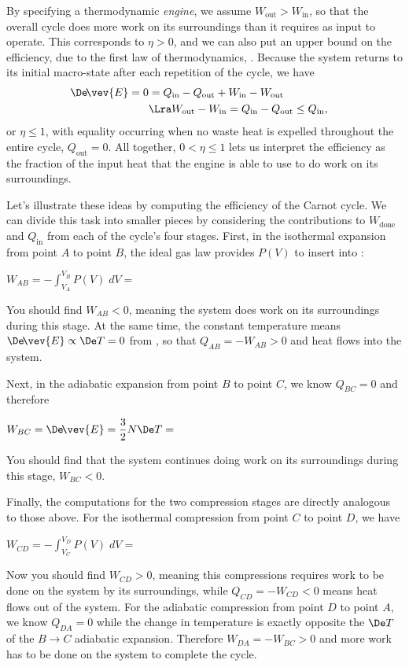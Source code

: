 By specifying a thermodynamic \textit{engine}, we assume $W_{\text{out}} > W_{\text{in}}$, so that the overall cycle does more work on its surroundings than it requires as input to operate.
This corresponds to $\eta > 0$, and we can also put an upper bound on the efficiency, due to the first law of thermodynamics, .
Because the system returns to its initial macro-state after each repetition of the cycle, we have
\begin{align}
  \De\!\vev{E} = 0 & = Q_{\text{in}} - Q_{\text{out}} + W_{\text{in}} - W_{\text{out}} \cr
                   & \Lra W_{\text{out}} - W_{\text{in}} = Q_{\text{in}} - Q_{\text{out}} \leq Q_{\text{in}}, \label{eq:cycle_heat_work}
\end{align}
or $\eta \leq 1$, with equality occurring when no waste heat is expelled throughout the entire cycle, $Q_{\text{out}} = 0$.
All together, $0 < \eta \leq 1$ lets us interpret the efficiency as the fraction of the input heat that the engine is able to use to do work on its surroundings.

Let's illustrate these ideas by computing the efficiency of the Carnot cycle.
We can divide this task into smaller pieces by considering the contributions to $W_{\text{done}}$ and $Q_{\text{in}}$ from each of the cycle's four stages.
First, in the isothermal expansion from point $A$ to point $B$, the ideal gas law provides $P(V)$ to insert into :
\begin{mdframed}
  $\displaystyle W_{AB} = -\int_{V_A}^{V_B} P(V) \; dV = $ \\[50 pt]
\end{mdframed}
You should find $W_{AB} < 0$, meaning the system does work on its surroundings during this stage.
At the same time, the constant temperature means $\De\!\vev{E} \propto \De T = 0$ from , so that $Q_{AB} = -W_{AB} > 0$ and heat flows into the system.

\newpage %
Next, in the adiabatic expansion from point $B$ to point $C$, we know $Q_{BC} = 0$ and therefore
\begin{mdframed}
  $\displaystyle W_{BC} = \De\!\vev{E} = \frac{3}{2}N\De T = $ \\[50 pt]
\end{mdframed}
You should find that the system continues doing work on its surroundings during this stage, $W_{BC} < 0$.

Finally, the computations for the two compression stages are directly analogous to those above.
For the isothermal compression from point $C$ to point $D$, we have
\begin{mdframed}
  $\displaystyle W_{CD} = -\int_{V_C}^{V_D} P(V) \; dV = $ \\[50 pt]
\end{mdframed}
Now you should find $W_{CD} > 0$, meaning this compressions requires work to be done on the system by its surroundings, while $Q_{CD} = -W_{CD} < 0$ means heat flows out of the system.
For the adiabatic compression from point $D$ to point $A$, we know $Q_{DA} = 0$ while the change in temperature is exactly opposite the $\De T$ of the $B \to C$ adiabatic expansion.
Therefore $W_{DA} = -W_{BC} > 0$ and more work has to be done on the system to complete the cycle.

